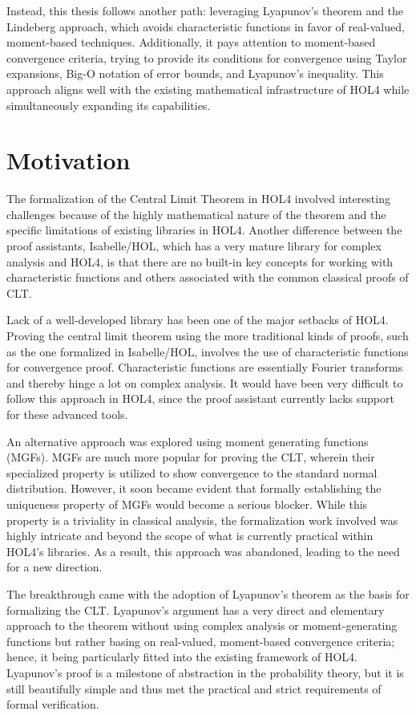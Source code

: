 Instead, this thesis follows another path: leveraging Lyapunov's theorem and the Lindeberg approach, which avoids characteristic functions in favor of real-valued, moment-based techniques. Additionally, it pays attention to moment-based convergence criteria, trying to provide its conditions for convergence using Taylor expansions, Big-O notation of error bounds, and Lyapunov's inequality. This approach aligns well with the existing mathematical infrastructure of HOL4 while simultaneously expanding its capabilities.

\section{Motivation}
The formalization of the Central Limit Theorem in HOL4 involved interesting challenges because of the highly mathematical nature of the theorem and the specific limitations of existing libraries in HOL4. Another difference between the proof assistants, Isabelle/HOL, which has a very mature library for complex analysis and HOL4, is that there are no built-in key concepts for working with characteristic functions and others associated with the common classical proofs of CLT.

Lack of a well-developed library has been one of the major setbacks of HOL4. Proving the central limit theorem using the more traditional kinds of proofs, such as the one formalized in Isabelle/HOL, involves the use of characteristic functions for convergence proof. Characteristic functions are essentially Fourier transforms and thereby hinge a lot on complex analysis. It would have been very difficult to follow this approach in HOL4, since the proof assistant currently lacks support for these advanced tools.

An alternative approach was explored using moment generating functions (MGFs). MGFs are much more popular for proving the CLT, wherein their specialized property is utilized to show convergence to the standard normal distribution. However, it soon became evident that formally establishing the uniqueness property of MGFs would become a serious blocker. While this property is a triviality in classical analysis, the formalization work involved was highly intricate and beyond the scope of what is currently practical within HOL4's libraries. As a result, this approach was abandoned, leading to the need for a new direction.

The breakthrough came with the adoption of Lyapunov's theorem as the basis for formalizing the CLT.  Lyapunov's argument has a very direct and elementary approach to the theorem without using complex analysis or moment-generating functions but rather basing on real-valued, moment-based convergence criteria; hence, it being particularly fitted into the existing framework of HOL4. Lyapunov's proof is a milestone of abstraction in the probability theory, but it is still beautifully simple and thus met the practical and strict requirements of formal verification.

